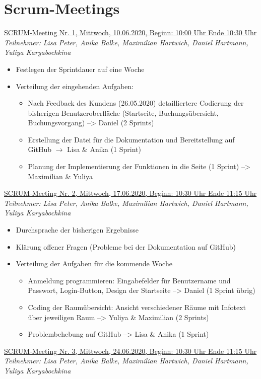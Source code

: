 \documentclass[a4paper,report,headsepline]{scrreprt}
\begin{document}
 
\section{Scrum-Meetings} 
 \underline{{\large SCRUM-Meeting Nr. 1, Mittwoch, 10.06.2020, Beginn: 10:00 Uhr Ende 10:30 Uhr}}  \\
\textit{Teilnehmer: Lisa Peter, Anika Balke, Maximilian Hartwich, Daniel Hartmann, Yuliya Karyabochkina}

\begin{itemize}
\item Festlegen der Sprintdauer auf eine Woche
\item Verteilung der eingehenden Aufgaben:
\begin{itemize}
\item Nach Feedback des Kundens (26.05.2020) detailliertere Codierung der bisherigen Benutzeroberfläche (Startseite, Buchungsübersicht, Buchungsvorgang) --> Daniel (2 Sprints)
\item Erstellung der Datei für die Dokumentation und Bereitstellung auf GitHub $\rightarrow$ Lisa \& Anika (1 Sprint)
\item Planung der Implementierung der Funktionen in die Seite (1 Sprint) --> Maximilian \& Yuliya 
\end{itemize}
\end{itemize}
 \underline{{\large SCRUM-Meeting Nr. 2, Mittwoch, 17.06.2020, Beginn: 10:30 Uhr Ende 11:15 Uhr}}  \\
\textit{Teilnehmer: Lisa Peter, Anika Balke, Maximilian Hartwich, Daniel Hartmann, Yuliya Karyabochkina}
      

\begin{itemize}
\item Durchsprache der bisherigen Ergebnisse
\item Klärung offener Fragen (Probleme bei der Dokumentation auf GitHub)
\item Verteilung der Aufgaben für die kommende Woche
\begin{itemize}
\item Anmeldung programmieren: Eingabefelder für Benutzername und Passwort, Login-Button, Design der Startseite --> Daniel (1 Sprint übrig)
\item Coding der Raumübersicht: Ansicht verschiedener Räume mit Infotext über jeweiligen Raum --> Yuliya \& Maximilian (2 Sprints)
\item Problembehebung auf GitHub --> Lisa \& Anika (1 Sprint)

\end{itemize}
\end{itemize}
 \underline{{\large SCRUM-Meeting Nr. 3, Mittwoch, 24.06.2020, Beginn: 10:30 Uhr Ende 11:15 Uhr}}  \\
\textit{Teilnehmer: Lisa Peter, Anika Balke, Maximilian Hartwich, Daniel Hartmann, Yuliya Karyabochkina}      
\end{document}
